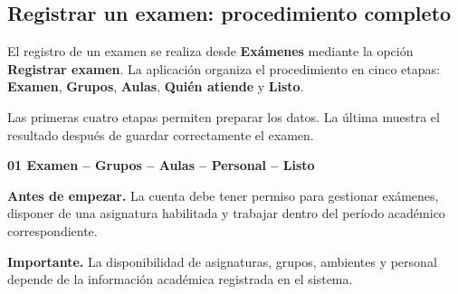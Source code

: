 
\subsection{Registrar un examen: procedimiento completo}
\label{sec:registro-examen}

El registro de un examen se realiza desde
\textbf{Exámenes} mediante la opción
\textbf{Registrar examen}. La aplicación organiza el
procedimiento en cinco etapas: \textbf{Examen},
\textbf{Grupos}, \textbf{Aulas},
\textbf{Quién atiende} y \textbf{Listo}.

Las primeras cuatro etapas permiten preparar los datos.
La última muestra el resultado después de guardar
correctamente el examen.

\medskip
\begin{center}
\small\bfseries\color{Teal}
01 Examen
\quad-- Grupos
\quad-- Aulas
\quad-- Personal
\quad-- Listo
\end{center}
\medskip

\noindent\textbf{Antes de empezar.}
La cuenta debe tener permiso para gestionar exámenes,
disponer de una asignatura habilitada y trabajar
dentro del período académico correspondiente.

\noindent\textbf{Importante.}
La disponibilidad de asignaturas, grupos, ambientes
y personal depende de la información académica
registrada en el sistema.


